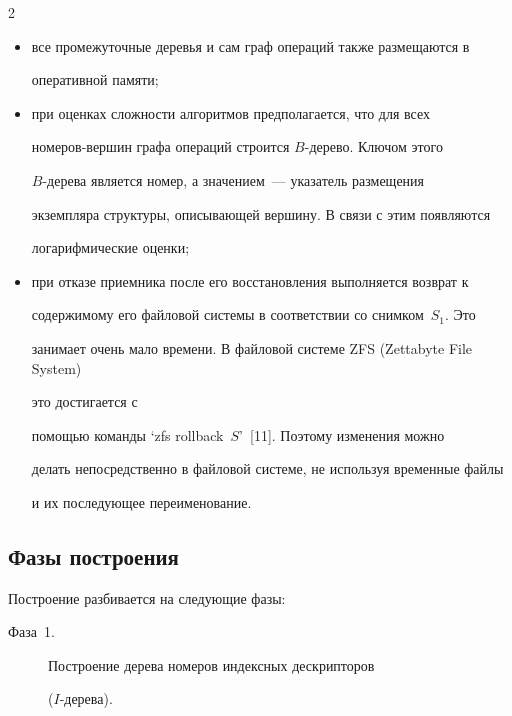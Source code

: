 \begin{multicols}{2}
\begin{itemize}
находится в оперативной памяти;\\[-15pt]


\item все промежуточные деревья и сам граф операций также размещаются в 


оперативной памяти;\\[-15pt]


\item при оценках сложности алгоритмов предполагается, что для всех 


номеров-вершин графа операций строится $B$-дерево. Ключом этого 


$B$-дерева является номер, а значением~--- указатель размещения 


экземпляра структуры, описывающей вершину. В связи с этим появляются 


логарифмические оценки;\\[-15pt]


\item при отказе приемника после его восстановления выполняется возврат к 


содержимому его файловой системы в соответствии со снимком~$S_1$. Это 


занимает очень мало времени. В файловой системе ZFS (Zettabyte File System)


это достигается с 


помощью команды `zfs rollback~$S$'~[11]. Поэтому изменения можно 


делать непосредственно в файловой системе, не используя временные файлы 


и их последующее переименование.


\end{itemize}





\subsection{Фазы построения}





      Построение разбивается на следующие фазы:


      \begin{description}


\item[Фаза~1.] Построение дерева номеров индексных дескрипторов 


($I$-дерева).



\end{description}
\end{multicols}
